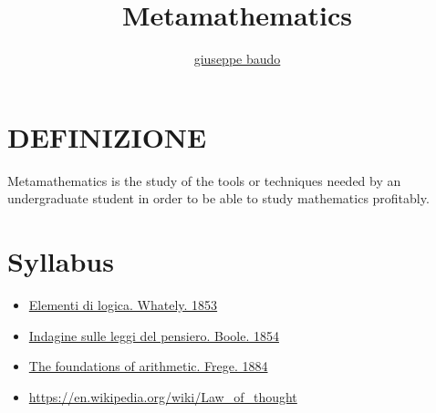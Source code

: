 \documentclass[a4paper,10pt]{article}
\title{Metamathematics}
\author{\href{http://www.baudo.hol.es}{giuseppe baudo}}
\begin{document}
\maketitle

\section{DEFINIZIONE}
Metamathematics is the study of the tools or techniques needed by an undergraduate student in order to be able to study mathematics profitably. 

\section{Syllabus}
\begin{itemize}
 \item \href{./ElementiDiLogicaWhately.html}{Elementi di logica. Whately. 1853}
 \item \href{./IndagineLeggiPensiero.html}{Indagine sulle leggi del pensiero. Boole. 1854}
 \item \href{./FoundationsOfArithmeticFrege.html}{The foundations of arithmetic. Frege. 1884}
 \item \url{https://en.wikipedia.org/wiki/Law_of_thought}
\end{itemize}
\end{document}
